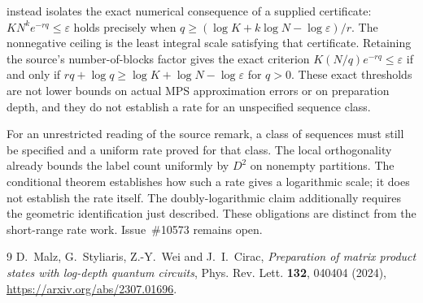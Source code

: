 \documentclass{article}
\begin{document}
 instead
isolates the exact numerical consequence of a supplied certificate:
$KN^ke^{-rq}\le\varepsilon$ holds precisely when
$q\ge(\log K+k\log N-\log\varepsilon)/r$.
The nonnegative ceiling is the least integral scale satisfying that
certificate. Retaining the source's number-of-blocks factor gives the
exact criterion
$K(N/q)e^{-rq}\le\varepsilon$ if and only if
$rq+\log q\ge\log K+\log N-\log\varepsilon$ for $q>0$.
These exact thresholds are not lower bounds on actual MPS approximation
errors or on preparation depth, and they do not establish a rate for an
unspecified sequence class.

For an unrestricted reading of the source remark, a class of sequences
must still be specified and a uniform rate proved for that class. The local orthogonality already
bounds the label count uniformly by $D^2$ on nonempty partitions. The conditional theorem establishes how such a rate
gives a logarithmic scale; it does not establish the rate itself. The
doubly-logarithmic claim additionally requires the geometric identification just described. These obligations are
distinct from the short-range rate work. Issue~\#10573 remains open.

\begin{thebibliography}{9}
D.~Malz, G.~Styliaris, Z.-Y.~Wei and J.~I.~Cirac,
\emph{Preparation of matrix product states with log-depth quantum circuits},
Phys. Rev. Lett. \textbf{132}, 040404 (2024),
\url{https://arxiv.org/abs/2307.01696}.
\end{thebibliography}
\end{document}
